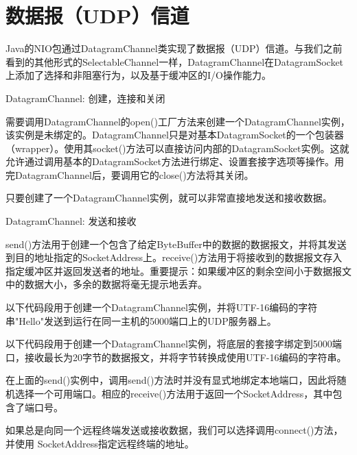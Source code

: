 \section{数据报（UDP）信道}

	Java的NIO包通过DatagramChannel类实现了数据报（UDP）信道。与我们之前看到的其他形式的SelectableChannel一样，DatagramChannel在DatagramSocket上添加了选择和非阻塞行为，以及基于缓冲区的I/O操作能力。

	DatagramChannel: 创建，连接和关闭

	

	需要调用DatagramChannel的open()工厂方法来创建一个DatagramChannel实例，该实例是未绑定的。DatagramChannel只是对基本DatagramSocket的一个包装器（wrapper）。使用其socket()方法可以直接访问内部的DatagramSocket实例。这就允许通过调用基本的DatagramSocket方法进行绑定、设置套接字选项等操作。用完DatagramChannel后，要调用它的close()方法将其关闭。

	只要创建了一个DatagramChannel实例，就可以非常直接地发送和接收数据。

	DatagramChannel: 发送和接收

	

	send()方法用于创建一个包含了给定ByteBuffer中的数据的数据报文，并将其发送到目的地址指定的SocketAddress上。receive()方法用于将接收到的数据报文存入指定缓冲区并返回发送者的地址。重要提示：如果缓冲区的剩余空间小于数据报文中的数据大小，多余的数据将毫无提示地丢弃。

	以下代码段用于创建一个DatagramChannel实例，并将UTF-16编码的字符串"Hello"发送到运行在同一主机的5000端口上的UDP服务器上。

	

	以下代码段用于创建一个DatagramChannel实例，将底层的套接字绑定到5000端口，接收最长为20字节的数据报文，并将字节转换成使用UTF-16编码的字符串。

	

	在上面的send()实例中，调用send()方法时并没有显式地绑定本地端口，因此将随机选择一个可用端口。相应的receive()方法用于返回一个SocketAddress，其中包含了端口号。

	如果总是向同一个远程终端发送或接收数据，我们可以选择调用connect()方法，并使用 SocketAddress指定远程终端的地址。

